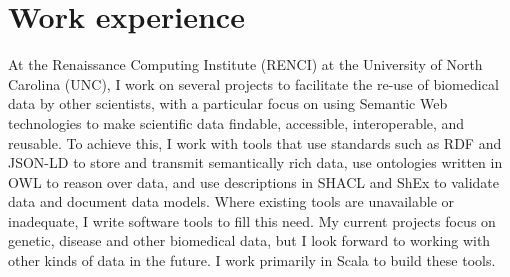 

\part{Work experience}


At the Renaissance Computing Institute (RENCI) at the University of North Carolina (UNC), I work on several projects to facilitate the re-use of biomedical data by other scientists, with a particular focus on using Semantic Web technologies to make scientific data findable, accessible, interoperable, and reusable. To achieve this, I work with tools that use standards such as RDF and JSON-LD to store and transmit semantically rich data, use ontologies written in OWL to reason over data, and use descriptions in SHACL and ShEx to validate data and document data models. Where existing tools are unavailable or inadequate, I write software tools to fill this need. My current projects focus on genetic, disease and other biomedical data, but I look forward to working with other kinds of data in the future. I work primarily in Scala to build these tools.

